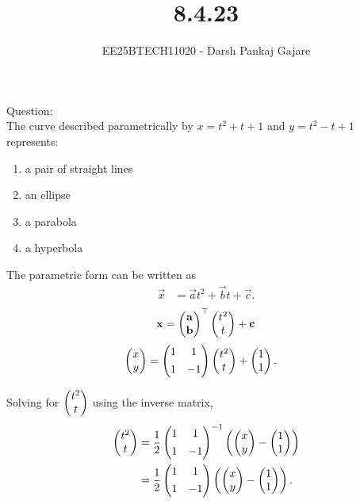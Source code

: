 \documentclass{beamer}
\let\solution\relax
\numberwithin{equation}{section}
\begin{document}
\title{8.4.23}
\author{EE25BTECH11020 - Darsh Pankaj Gajare}
{\let\newpage\relax\maketitle}

Question:\\
The curve described parametrically by $x = t^2 + t + 1$ and $y = t^2 - t + 1$ represents:
\begin{multicols}{2}
	\begin{enumerate}[label=(\Alph*)]
\item a pair of straight lines
\item an ellipse
\item a parabola
\item a hyperbola
\end{enumerate}
\end{multicols}


\solution
\begin{table}[H]
	\centering
	\caption{}
	
	\label{}
\end{table}

The parametric form can be written as
\begin{align}
\vec{x} &= \vec{a}t^2 + \vec{b}t + \vec{c}.
\end{align}
\begin{align}
	\mathbf{x}=\begin{pmatrix}\mathbf{a}\\\mathbf{b}\end{pmatrix}^\top\begin{pmatrix}t^2\\t\end{pmatrix}+\mathbf{c}
\end{align}
\begin{align}
\begin{pmatrix}x\\y\end{pmatrix}
&= 
\begin{pmatrix}1 & 1\\[4pt]1 & -1\end{pmatrix}
\begin{pmatrix}t^2\\t\end{pmatrix} + \begin{pmatrix}1\\1\end{pmatrix}.
\end{align}

Solving for $\begin{pmatrix}t^2\\t\end{pmatrix}$ using the inverse matrix,
\begin{align}
\begin{pmatrix}t^2\\t\end{pmatrix}
&= 
\frac{1}{2}
\begin{pmatrix}1 & 1\\[4pt]1 & -1\end{pmatrix}
^{-1}
\left(\begin{pmatrix}x\\y\end{pmatrix}-\begin{pmatrix}1\\1\end{pmatrix}\right)\\
&= 
\frac{1}{2}
\begin{pmatrix}1 & 1\\[4pt]1 & -1\end{pmatrix}
\left(\begin{pmatrix}x\\y\end{pmatrix}-\begin{pmatrix}1\\1\end{pmatrix}\right).
\end{align}
\end{document}
